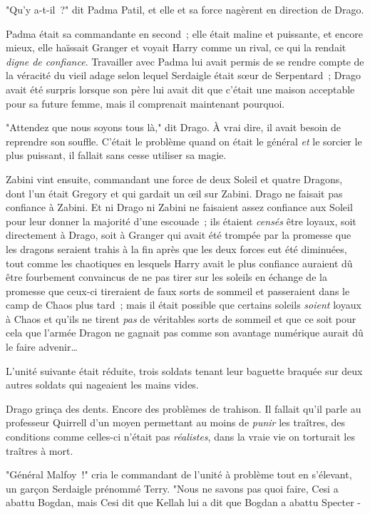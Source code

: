 "Qu'y a-t-il~?" dit Padma Patil, et elle et sa force nagèrent en direction de Drago.

Padma était sa commandante en second~; elle était maline et puissante, et encore mieux, elle haïssait Granger et voyait Harry comme un rival, ce qui la rendait \emph{digne de confiance}. Travailler avec Padma lui avait permis de se rendre compte de la véracité du vieil adage selon lequel Serdaigle était sœur de Serpentard~; Drago avait été surpris lorsque son père lui avait dit que c'était une maison acceptable pour sa future femme, mais il comprenait maintenant pourquoi.

"Attendez que nous soyons tous là," dit Drago. À vrai dire, il avait besoin de reprendre son souffle. C'était le problème quand on était le général \emph{et} le sorcier le plus puissant, il fallait sans cesse utiliser sa magie.

Zabini vint ensuite, commandant une force de deux Soleil et quatre Dragons, dont l'un était Gregory et qui gardait un œil sur Zabini. Drago ne faisait pas confiance à Zabini. Et ni Drago ni Zabini ne faisaient assez confiance aux Soleil pour leur donner la majorité d'une escouade~; ils étaient \emph{censés} être loyaux, soit directement à Drago, soit à Granger qui avait été trompée par la promesse que les dragons seraient trahis à la fin après que les deux forces eut été diminuées, tout comme les chaotiques en lesquels Harry avait le plus confiance auraient dû être fourbement convaincus de ne pas tirer sur les soleils en échange de la promesse que ceux-ci tireraient de faux sorts de sommeil et passeraient dans le camp de Chaos plus tard~; mais il était possible que certains soleils \emph{soient} loyaux à Chaos et qu'ils ne tirent \emph{pas} de véritables sorts de sommeil et que ce soit pour cela que l'armée Dragon ne gagnait pas comme son avantage numérique aurait dû le faire advenir…

L'unité suivante était réduite, trois soldats tenant leur baguette braquée sur deux autres soldats qui nageaient les mains vides.

Drago grinça des dents. Encore des problèmes de trahison. Il fallait qu'il parle au professeur Quirrell d'un moyen permettant au moins de \emph{punir} les traîtres, des conditions comme celles-ci n'était pas \emph{réalistes}, dans la vraie vie on torturait les traîtres à mort.

"Général Malfoy~!" cria le commandant de l'unité à problème tout en s'élevant, un garçon Serdaigle prénommé Terry. "Nous ne savons pas quoi faire, Cesi a abattu Bogdan, mais Cesi dit que Kellah lui a dit que Bogdan a abattu Specter -

